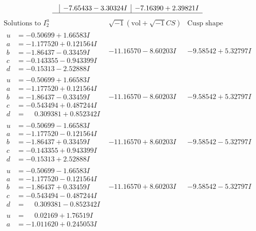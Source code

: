 \documentclass[1p]{elsarticle_modified}
\theoremstyle{definition}
\newcommand{\I}{\sqrt{-1}}
\begin{document}
$$\begin{array}{c|c|c}
 & -7.65433 - 3.30324 I & -7.16390 + 2.39821 I\\
 \hline 
 \end{array}$$\newpage$$\begin{array}{c|c|c}  
\text{Solutions to }I^u_{2}& \I (\text{vol} + \sqrt{-1}CS) & \text{Cusp shape}\\
 \hline 
\begin{aligned}
u &= -0.50699 + 1.66583 I \\
a &= -1.177520 + 0.121564 I \\
b &= -1.86437 - 0.33459 I \\
c &= -0.143355 - 0.943399 I \\
d &= -0.15313 - 2.52888 I\end{aligned}
 & -11.16570 - 8.60203 I & -9.58542 + 5.32797 I \\ \hline\begin{aligned}
u &= -0.50699 + 1.66583 I \\
a &= -1.177520 + 0.121564 I \\
b &= -1.86437 - 0.33459 I \\
c &= -0.543494 + 0.487244 I \\
d &= \phantom{-}0.309381 + 0.852342 I\end{aligned}
 & -11.16570 - 8.60203 I & -9.58542 + 5.32797 I \\ \hline\begin{aligned}
u &= -0.50699 - 1.66583 I \\
a &= -1.177520 - 0.121564 I \\
b &= -1.86437 + 0.33459 I \\
c &= -0.143355 + 0.943399 I \\
d &= -0.15313 + 2.52888 I\end{aligned}
 & -11.16570 + 8.60203 I & -9.58542 - 5.32797 I \\ \hline\begin{aligned}
u &= -0.50699 - 1.66583 I \\
a &= -1.177520 - 0.121564 I \\
b &= -1.86437 + 0.33459 I \\
c &= -0.543494 - 0.487244 I \\
d &= \phantom{-}0.309381 - 0.852342 I\end{aligned}
 & -11.16570 + 8.60203 I & -9.58542 - 5.32797 I \\ \hline\begin{aligned}
u &= \phantom{-}0.02169 + 1.76519 I \\
a &= -1.011620 + 0.245053 I \\

\end{aligned}
\end{array}$$
\end{document}
